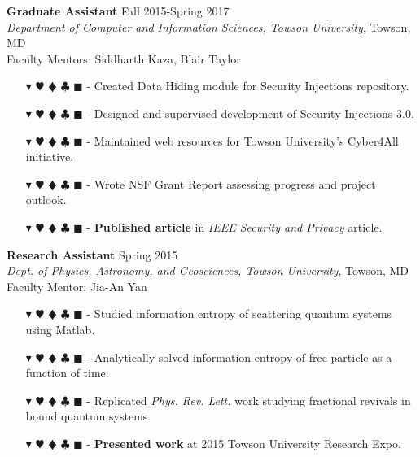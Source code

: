 \documentclass[overlapped, 10pt]{res} %
\newcommand{\physics}{$\blacktriangledown$}
\newcommand{\biochem}{$\varheartsuit$}
\newcommand{\shannon}{$\vardiamondsuit$}
\newcommand{\classic}{$\clubsuit$}
\newcommand{\quantum}{$\blacksquare$}
\newcommand{\physicscolor}{\color{YellowOrange}}
\newcommand{\biochemcolor}{\color{Emerald}}
\newcommand{\shannoncolor}{\color{Goldenrod}}
\newcommand{\classiccolor}{\color{Cyan}}
\newcommand{\quantumcolor}{\color{RedOrange}}
\newcommand{\tag}[1]{
    {\IfSubStr{#1}{\physics}{\physicscolor}{\color{White}}\physics}
    {\IfSubStr{#1}{\biochem}{\biochemcolor}{\color{White}}\biochem}
    {\IfSubStr{#1}{\shannon}{\shannoncolor}{\color{White}}\shannon}
    {\IfSubStr{#1}{\classic}{\classiccolor}{\color{White}}\classic}
    {\IfSubStr{#1}{\quantum}{\quantumcolor}{\color{White}}\quantum}
}
\begin{document}
\begin{resume}
\textbf{Graduate Assistant} \hfill Fall 2015-Spring 2017 \\
\textit{Department of Computer and Information Sciences, Towson University}, Towson, MD \\
Faculty Mentors: Siddharth Kaza, Blair Taylor
\begin{itemize} \itemsep -2pt %
\item[\tag{\classic}-] Created Data Hiding module for Security Injections repository.
\item[\tag{\classic}-] Designed and supervised development of Security Injections 3.0.
\item[\tag{\classic}-] Maintained web resources for Towson University's Cyber4All initiative.
\item[\tag{}-] Wrote NSF Grant Report assessing progress and project outlook.
\item[\tag{}-] \textbf{Published article} in \textit{IEEE Security and Privacy} article.
\end{itemize}

\textbf{Research Assistant} \hfill Spring 2015 \\
\textit{Dept. of Physics, Astronomy, and Geosciences, Towson University}, Towson, MD \\
Faculty Mentor: Jia-An Yan
\begin{itemize} \itemsep -2pt %
\item[\tag{\physics\shannon\classic}-] Studied information entropy of scattering quantum systems using Matlab.
\item[\tag{\physics\shannon}-] Analytically solved information entropy of free particle as a function of time.
\item[\tag{\physics\shannon\classic}-] Replicated \textit{Phys. Rev. Lett.} work studying fractional revivals in bound quantum systems.
\item[\tag{}-] \textbf{Presented work} at 2015 Towson University Research Expo.
\end{itemize}


\end{resume}
\end{document}

